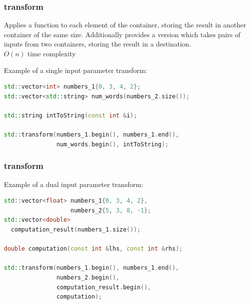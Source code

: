 \documentclass{beamer}
\begin{document}
\begin{frame}[fragile]
  \frametitle{transform}
  Applies a function to each element of the container,
  storing the result in another container of the same size.
  Additionally provides a version which takes pairs of inputs from two containers,
  storing the result in a destination.\\
  $O(n)$ time complexity

  Example of a single input parameter transform:
  \begin{lstlisting}[language=C++]
std::vector<int> numbers_1{0, 3, 4, 2};
std::vector<std::string> num_words(numbers_2.size());

std::string intToString(const int &i);

std::transform(numbers_1.begin(), numbers_1.end(),
               num_words.begin(), intToString);
  \end{lstlisting}
\end{frame}

\begin{frame}[fragile]
  \frametitle{transform}
  Example of a dual input parameter transform:
  \begin{lstlisting}[language=C++]
std::vector<float> numbers_1{0, 3, 4, 2},
                   numbers_2{5, 3, 8, -1};
std::vector<double>
  computation_result(numbers_1.size());

double computation(const int &lhs, const int &rhs);

std::transform(numbers_1.begin(), numbers_1.end(),
               numbers_2.begin(),
               computation_result.begin(),
               computation);
  \end{lstlisting}
\end{frame}



\end{document}

